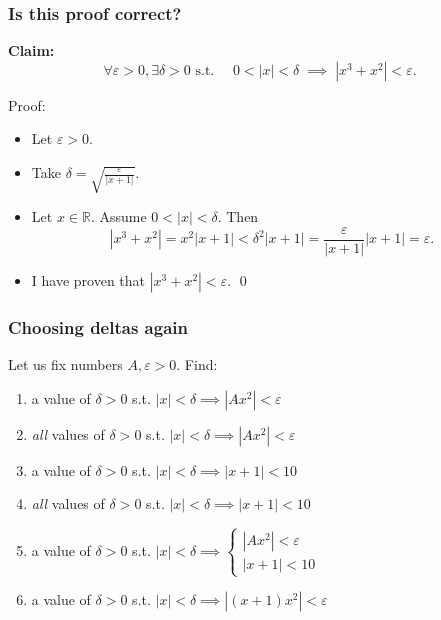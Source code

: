 \documentclass[14pt]{beamer}
\begin{document}
\begin{frame}[t]
	\frametitle{Is this proof correct?}

	{\bfseries Claim:}
	\[
		\forall \varepsilon >0, \exists \delta>0 \text{ s.t. }\quad 0<|x|<\delta \; \implies
		\; |x^{3}+x^{2}| < \varepsilon.
	\]
	\vfill
	\begin{block}{Proof:}
		\begin{itemize}
			\item Let $\varepsilon >0$.

			\item Take $\displaystyle \delta = \sqrt{\frac{\varepsilon}{|x+1|}}$.

			\item Let $x \in \mathbb{R}$. Assume $0 < |x| < \delta$. Then
				\[
					|x^{3}+x^{2}| = x^{2}| x + 1| < \delta^{2}|x+1| = \frac{\varepsilon}{|x+1|}
					|x+1| = \varepsilon.
				\]

			\item I have proven that $\displaystyle |x^{3}+x^{2}| < \varepsilon$.
				\hfill \qed
		\end{itemize}
	\end{block}

	\vfill
\end{frame}

\begin{frame}[t]
	\frametitle{Choosing deltas again}

	Let us fix numbers $A, \varepsilon >0$. Find:

	\vfill

	\begin{enumerate}
		\item a value of $\delta >0$ \; s.t. \hfill
			$\displaystyle |x|< \delta \implies |Ax^{2}|<\varepsilon$
			\vfill

		\item \emph{all} values of $\delta >0$ \; s.t. \hfill $\displaystyle |x|< \delta
			\implies |Ax^{2}|<\varepsilon$
			\vfill

		\item a value of $\delta >0$ \; s.t. \hfill
			$\displaystyle |x|< \delta \implies |x+1| < 10$
			\vfill

		\item \emph{all} values of $\delta >0$ \; s.t. \hfill $\displaystyle |x|< \delta
			\implies |x+1| < 10$
			\vfill

		\item a value of $\delta >0$ \; s.t. \hfill
			$\displaystyle |x|< \delta \implies \left\{
			\begin{array}{c}
				|Ax^2|<\varepsilon \\
				|x+1| < 10
			\end{array}
			\right.$
			\vfill

		\item a value of $\delta >0$ \; s.t. \hfill
			$\displaystyle |x| < \delta \implies |(x+1)x^{2}| < \varepsilon$
			\vfill
	\end{enumerate}
\end{frame}
\end{document}
